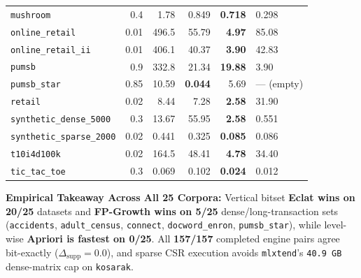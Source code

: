 \begin{table}[ht!]
\begin{tabular*}{\textwidth}{@{\extracolsep{\fill}}lrrrrl@{}}
\texttt{mushroom} & 0.4 & 1.78 & 0.849 & \textbf{0.718} & 0.298 \\
\texttt{online\_\protect\allowbreak{}retail} & 0.01 & 496.5 & 55.79 & \textbf{4.97} & 85.08 \\
\texttt{online\_\protect\allowbreak{}retail\_\protect\allowbreak{}ii} & 0.01 & 406.1 & 40.37 & \textbf{3.90} & 42.83 \\
\texttt{pumsb} & 0.9 & 332.8 & 21.34 & \textbf{19.88} & 3.90 \\
\texttt{pumsb\_\protect\allowbreak{}star} & 0.85 & 10.59 & \textbf{0.044} & 5.69 & --- (empty) \\
\texttt{retail} & 0.02 & 8.44 & 7.28 & \textbf{2.58} & 31.90 \\
\texttt{synthetic\_\protect\allowbreak{}dense\_\protect\allowbreak{}5000} & 0.3 & 13.67 & 55.95 & \textbf{2.58} & 0.551 \\
\texttt{synthetic\_\protect\allowbreak{}sparse\_\protect\allowbreak{}2000} & 0.02 & 0.441 & 0.325 & \textbf{0.085} & 0.086 \\
\texttt{t10i4d100k} & 0.02 & 164.5 & 48.41 & \textbf{4.78} & 34.40 \\
\texttt{tic\_\protect\allowbreak{}tac\_\protect\allowbreak{}toe} & 0.3 & 0.069 & 0.102 & \textbf{0.024} & 0.012 \\
\bottomrule
\end{tabular*}
\end{table}

\begin{klbox}[KLGreen]
\fontsize{9.5}{12.5}\selectfont
\textbf{Empirical Takeaway Across All 25 Corpora:} Vertical bitset \textbf{Eclat wins on 20/25} datasets and \textbf{FP-Growth wins on 5/25} dense/long-transaction sets (\texttt{accidents}, \texttt{adult\_\protect\allowbreak{}census}, \texttt{connect}, \texttt{docword\_\protect\allowbreak{}enron}, \texttt{pumsb\_\protect\allowbreak{}star}), while level-wise \textbf{Apriori is fastest on 0/25}. All \textbf{157/157} completed engine pairs agree bit-exactly ($\Delta_{\mathrm{supp}} = 0.0$), and sparse CSR execution avoids \texttt{mlxtend}'s \texttt{40.9 GB} dense-matrix cap on \texttt{kosarak}.
\end{klbox}
